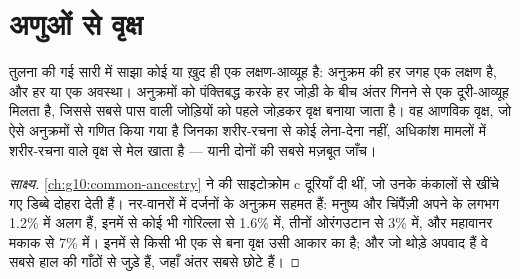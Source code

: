 \section{अणुओं से वृक्ष}

\begin{proposition}[आणविक जातिवृत्त]\label{prop:g12:phylogenetic-trees:molecular}
तुलना की गई सारी  में साझा कोई  या  ख़ुद ही एक लक्षण-आव्यूह
है: अनुक्रम की हर जगह एक लक्षण है, और हर  या  एक
अवस्था। अनुक्रमों को पंक्तिबद्ध करके हर जोड़ी के बीच अंतर गिनने से एक
दूरी-आव्यूह मिलता है, जिससे सबसे पास वाली जोड़ियों को पहले जोड़कर वृक्ष
बनाया जाता है। वह आणविक वृक्ष, जो ऐसे अनुक्रमों से गणित किया गया है जिनका
शरीर-रचना से कोई लेना-देना नहीं, अधिकांश मामलों में शरीर-रचना वाले वृक्ष से
मेल खाता है --- यानी दोनों की सबसे मज़बूत जाँच।
\end{proposition}
\begin{proof}[साक्ष्य]
\cref{ch:g10:common-ancestry} ने  की साइटोक्रोम c दूरियाँ दी थीं,
जो उनके कंकालों से खींचे गए डिब्बे दोहरा देती हैं। नर-वानरों में दर्जनों
 के अनुक्रम सहमत हैं: मनुष्य और चिंपैंज़ी अपने  के लगभग 1.2\% में
अलग हैं, इनमें से कोई भी गोरिल्ला से 1.6\% में, तीनों ओरंगउटान से 3\% में,
और महावानर मकाक से 7\% में। इनमें से किसी भी एक  से बना वृक्ष उसी आकार
का है; और जो थोड़े अपवाद हैं वे सबसे हाल की गाँठों से जुड़े हैं, जहाँ अंतर
सबसे छोटे हैं।
\end{proof}

